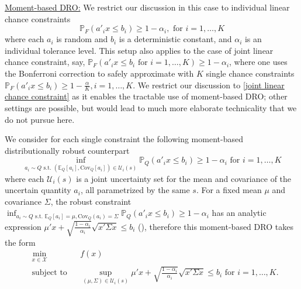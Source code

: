 \documentclass[mnsc,blindrev]{informs4} %
\begin{document}
\smallskip




\noindent\underline{Moment-based DRO:}
We restrict our discussion in this case to individual linear chance constraints
\begin{equation}\label{joint linear chance constraint}
\mathbb P_F(a'_ix\leq b_i)\geq 1-\alpha_i,\text{\ \ for }i=1,\ldots,K
\end{equation}
where each $a_i$ is random and $b_i$ is a deterministic constant, and $\alpha_i$ is an individual tolerance level. This setup also applies to the case of joint linear chance constraint, say, $\mathbb P_F(a'_ix\leq b_i\text{ for }i=1,\ldots,K)\geq 1-\alpha_i$, where one uses the Bonferroni correction to safely approximate with $K$ single chance constraints $\mathbb P_F(a'_ix\leq b_i)\geq 1-\frac{\alpha}{K},i=1,\ldots,K$. We restrict our discussion to \eqref{joint linear chance constraint} as it enables the tractable use of moment-based DRO; other settings are possible, but would lead to much more elaborate technicality that we do not pursue here.

We consider for each single constraint the following moment-based distributionally robust counterpart
\begin{equation*}
    \inf_{a_i\sim Q\text{ s.t. }(\mathbb E_{Q}[a_i],\mathrm{Cov}_{Q}[a_i])\in \mathcal U_i(s)}\mathbb P_Q(a'_ix\leq b_i)\geq 1-\alpha_i\text{\ \ for }i=1,\ldots,K
\end{equation*}
where each $\mathcal U_i(s)$ is a joint uncertainty set for the mean and covariance of the uncertain quantity $a_i$, all parametrized by the same $s$. For a fixed mean $\mu$ and covariance $\Sigma$, the robust constraint $\inf_{a_i\sim Q\text{ s.t. }\mathbb E_Q[a_i]=\mu,\mathrm{Cov}_{Q}(a_i)=\Sigma}\mathbb P_Q(a'_ix\leq b_i)\geq 1-\alpha_i$ has an analytic expression $\mu'x+\sqrt{\frac{1-\alpha_i}{\alpha_i}}\sqrt{x'\Sigma x}\leq b_i$ (\cite{ghaoui2003worst}), therefore this moment-based DRO takes the form
\begin{equation}\label{moment DRO CCP}
\begin{aligned}
    &\min_{x\in\mathcal X}&&f(x)\\
    &\text{subject to}&&\sup_{(\mu,\Sigma)\in \mathcal U_i(s)}\mu'x+\sqrt{\frac{1-\alpha_i}{\alpha_i}}\sqrt{x'\Sigma x}\leq b_i\text{\ \ for }i=1,\ldots,K.
\end{aligned}
\end{equation}
\end{document}
